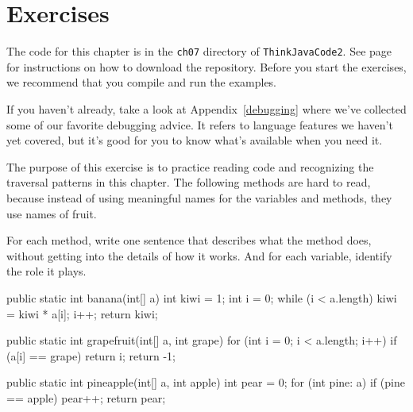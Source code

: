 \section{Exercises}

The code for this chapter is in the {\tt ch07} directory of {\tt ThinkJavaCode2}.
See page~\pageref{code} for instructions on how to download the repository.
Before you start the exercises, we recommend that you compile and run the examples.

If you haven't already, take a look at Appendix~\ref{debugging} where we've collected some of our favorite debugging advice.
It refers to language features we haven't yet covered, but it's good for you to know what's available when you need it.


\begin{exercise}  %

The purpose of this exercise is to practice reading code and recognizing the traversal patterns in this chapter.
The following methods are hard to read, because instead of using meaningful names for the variables and methods, they use names of fruit.

For each method, write one sentence that describes what the method does, without getting into the details of how it works.
And for each variable, identify the role it plays.

\begin{code}
public static int banana(int[] a) {
    int kiwi = 1;
    int i = 0;
    while (i < a.length) {
        kiwi = kiwi * a[i];
        i++;
    }
    return kiwi;
}
\end{code}

\begin{code}
public static int grapefruit(int[] a, int grape) {
    for (int i = 0; i < a.length; i++) {
        if (a[i] == grape) {
            return i;
        }
    }
    return -1;
}
\end{code}

\begin{code}
public static int pineapple(int[] a, int apple) {
    int pear = 0;
    for (int pine: a) {
        if (pine == apple) {
            pear++;
        }
    }
    return pear;
}
\end{code}

\end{exercise}


